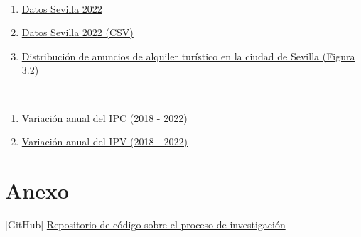 \documentclass[a4paper,10pt]{article}
\begin{document}
\begin{multicols}{2}
\begin{thebibliography}{20}
                \
                \begin{enumerate}
                    \item \href{http://insideairbnb.com/get-the-data/}{Datos Sevilla 2022}
                    \item \href{http://data.insideairbnb.com/spain/andaluc%C3%ADa/sevilla/2023-03-31/visualisations/listings.csv}{Datos Sevilla 2022 (CSV)}
                    \item \href{http://insideairbnb.com/sevilla}{Distribución de anuncios de alquiler turístico en la ciudad de Sevilla (Figura 3.2)}
                \end{enumerate}

                \
                \begin{enumerate}
                    \item \href{https://www.ine.es/jaxiT3/Datos.htm?t=50934}{Variación anual del IPC (2018 - 2022)}
                    \item \href{https://www.ine.es/jaxiT3/Datos.htm?t=25173}{Variación anual del IPV (2018 - 2022)}
                \end{enumerate}

    \end{thebibliography}
        
    \hypertarget{anexo}{}
    \section*{Anexo}

        \hypertarget{github}{[GitHub] \href{https://github.com/m7pantoja/TouristRental}{Repositorio de código sobre el proceso de investigación}}

    \end{multicols}
    \setlength{\columnsep}{10pt}
\end{document}
